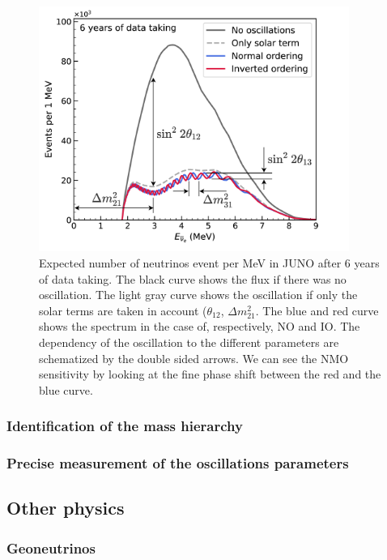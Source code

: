 \begin{figure}
  \centering
  \includegraphics[height=8cm]{images/juno/Spectrum-OscillationsOnly_dm2_31.png}
  \caption{Expected number of neutrinos event per MeV in JUNO after 6 years of data taking. The black curve shows the flux if there was no oscillation. The light gray curve shows the oscillation if only the solar terms are taken in account ($\theta_{12}$, $\Delta m_{21}^2$. The blue and red curve shows the spectrum in the case of, respectively, NO and IO. The dependency of the oscillation to the different parameters are schematized by the double sided arrows. We can see the NMO sensitivity by looking at the fine phase shift between the red and the blue curve.}
  \label{fig:juno-spectrum-oscillation}
\end{figure}

\subsubsection{Identification of the mass hierarchy}


\subsubsection{Precise measurement of the oscillations parameters}

\subsection{Other physics}

\subsubsection{Geoneutrinos}

